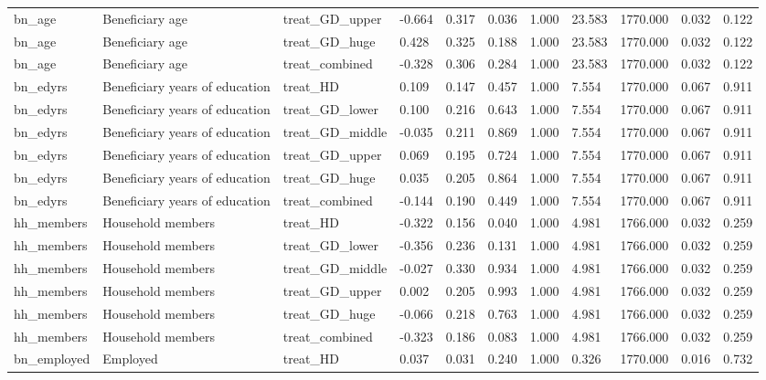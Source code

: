 \begin{tabular}{lllllllllll}
bn\_age & Beneficiary age & treat\_GD\_upper & -0.664 & 0.317 & 0.036 & 1.000 & 23.583 & 1770.000 & 0.032 & 0.122 \\
bn\_age & Beneficiary age & treat\_GD\_huge & 0.428 & 0.325 & 0.188 & 1.000 & 23.583 & 1770.000 & 0.032 & 0.122 \\
bn\_age & Beneficiary age & treat\_combined & -0.328 & 0.306 & 0.284 & 1.000 & 23.583 & 1770.000 & 0.032 & 0.122 \\
bn\_edyrs & Beneficiary years of education & treat\_HD & 0.109 & 0.147 & 0.457 & 1.000 & 7.554 & 1770.000 & 0.067 & 0.911 \\
bn\_edyrs & Beneficiary years of education & treat\_GD\_lower & 0.100 & 0.216 & 0.643 & 1.000 & 7.554 & 1770.000 & 0.067 & 0.911 \\
bn\_edyrs & Beneficiary years of education & treat\_GD\_middle & -0.035 & 0.211 & 0.869 & 1.000 & 7.554 & 1770.000 & 0.067 & 0.911 \\
bn\_edyrs & Beneficiary years of education & treat\_GD\_upper & 0.069 & 0.195 & 0.724 & 1.000 & 7.554 & 1770.000 & 0.067 & 0.911 \\
bn\_edyrs & Beneficiary years of education & treat\_GD\_huge & 0.035 & 0.205 & 0.864 & 1.000 & 7.554 & 1770.000 & 0.067 & 0.911 \\
bn\_edyrs & Beneficiary years of education & treat\_combined & -0.144 & 0.190 & 0.449 & 1.000 & 7.554 & 1770.000 & 0.067 & 0.911 \\
hh\_members & Household members & treat\_HD & -0.322 & 0.156 & 0.040 & 1.000 & 4.981 & 1766.000 & 0.032 & 0.259 \\
hh\_members & Household members & treat\_GD\_lower & -0.356 & 0.236 & 0.131 & 1.000 & 4.981 & 1766.000 & 0.032 & 0.259 \\
hh\_members & Household members & treat\_GD\_middle & -0.027 & 0.330 & 0.934 & 1.000 & 4.981 & 1766.000 & 0.032 & 0.259 \\
hh\_members & Household members & treat\_GD\_upper & 0.002 & 0.205 & 0.993 & 1.000 & 4.981 & 1766.000 & 0.032 & 0.259 \\
hh\_members & Household members & treat\_GD\_huge & -0.066 & 0.218 & 0.763 & 1.000 & 4.981 & 1766.000 & 0.032 & 0.259 \\
hh\_members & Household members & treat\_combined & -0.323 & 0.186 & 0.083 & 1.000 & 4.981 & 1766.000 & 0.032 & 0.259 \\
bn\_employed & Employed & treat\_HD & 0.037 & 0.031 & 0.240 & 1.000 & 0.326 & 1770.000 & 0.016 & 0.732 \\

\end{tabular}

